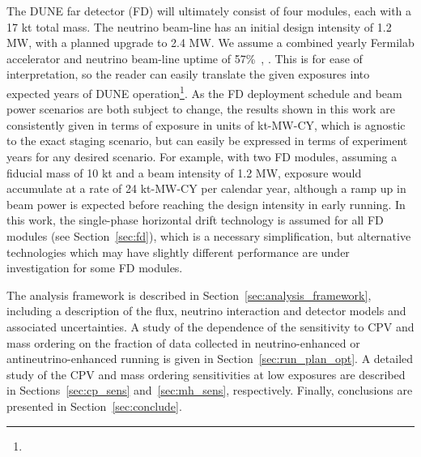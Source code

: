 The DUNE far detector (FD) will ultimately consist of four modules, each with a 17 kt total mass. The neutrino beam-line has an initial design intensity of 1.2 MW, with a planned upgrade to 2.4 MW. We assume a combined yearly Fermilab accelerator and neutrino beam-line uptime of 57\%~\cite{Abi:2020evt}, . This is for ease of interpretation, so the reader can easily translate the given exposures into expected years of DUNE operation\footnote{}. As the FD deployment schedule and beam power scenarios are both subject to change, the results shown in this work are consistently given in terms of exposure in units of kt-MW-CY, which is agnostic to the exact staging scenario, but can easily be expressed in terms of experiment years for any desired scenario. For example, with two FD modules, assuming a fiducial mass of 10 kt and a beam intensity of 1.2 MW, exposure would accumulate at a rate of 24 kt-MW-CY per calendar year, although a ramp up in beam power is expected before reaching the design intensity in early running. In this work, the single-phase horizontal drift technology is assumed for all FD modules (see Section~\ref{sec:fd}), which is a necessary simplification, but alternative technologies which may have slightly different performance are under investigation for some FD modules.

The analysis framework is described in Section~\ref{sec:analysis_framework}, including a description of the flux, neutrino interaction and detector models and associated uncertainties. A study of the dependence of the sensitivity to CPV and mass ordering on the fraction of data collected in neutrino-enhanced or antineutrino-enhanced running is given in Section~\ref{sec:run_plan_opt}. A detailed study of the CPV and mass ordering sensitivities at low exposures are described in Sections~\ref{sec:cp_sens} and~\ref{sec:mh_sens}, respectively. Finally, conclusions are presented in Section~\ref{sec:conclude}.

